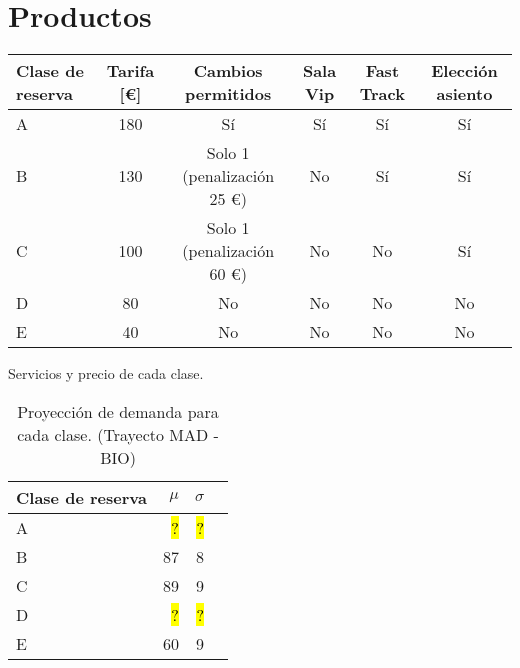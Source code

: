 \documentclass[12pt]{article}
\begin{document}
\section{Productos}


\begin{adjustwidth}{-2.5 cm}{-2.5 cm}\centering
\begin{threeparttable}[!htb]

\small
\begin{tabular}{lccccc}\toprule
Clase de reserva &Tarifa [\euro] &Cambios permitidos &Sala Vip &Fast Track &Elección asiento \\\midrule
A &180 &Sí &Sí &Sí &Sí \\
B &130 &Solo 1 (penalización 25 \euro) &No &Sí &Sí \\
C &100 &Solo 1 (penalización 60 \euro) &No &No &Sí \\
D &80 &No &No &No &No \\
E &40 &No &No &No &No \\
\bottomrule
\end{tabular}
\caption{Servicios y precio de cada clase.}\label{tab:clases}
\end{threeparttable}

\end{adjustwidth}





\begin{table}[!htp]\centering

\begin{tabular}{lrrr}\toprule
Clase de reserva &$\mu$ &$\sigma$ \\\midrule
A &\hl{ ? } &\hl{ ? } \\
B &87 &8 \\
C &89 &9 \\
D &\hl{ ? } &\hl{ ? } \\
E &60 &9 \\
\bottomrule
\end{tabular}

\caption{Proyección de demanda para cada clase. (Trayecto MAD - BIO)}\label{tab:demanda}
\end{table}
\end{document}
